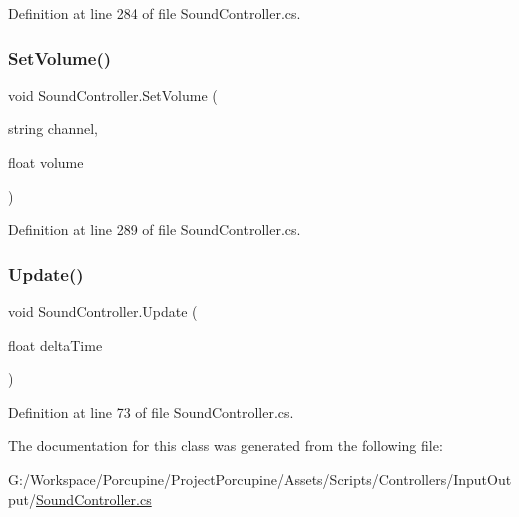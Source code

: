 Definition at line 284 of file Sound\+Controller.\+cs.

\mbox{\label{class_sound_controller_a07ee1ed4defecdd71d576c3349ccbc4c}} 
\subsubsection{\texorpdfstring{Set\+Volume()}{SetVolume()}\hspace{0.1cm}{\footnotesize\ttfamily [2/2]}}
{\footnotesize\ttfamily void Sound\+Controller.\+Set\+Volume (\begin{DoxyParamCaption}\item[{string}]{channel,  }\item[{float}]{volume }\end{DoxyParamCaption})}



Definition at line 289 of file Sound\+Controller.\+cs.

\mbox{\label{class_sound_controller_ae855044aa3506d706299f79ec8dd48f3}} 
\subsubsection{\texorpdfstring{Update()}{Update()}}
{\footnotesize\ttfamily void Sound\+Controller.\+Update (\begin{DoxyParamCaption}\item[{float}]{delta\+Time }\end{DoxyParamCaption})}



Definition at line 73 of file Sound\+Controller.\+cs.



The documentation for this class was generated from the following file\+:\begin{DoxyCompactItemize}
\item 
G\+:/\+Workspace/\+Porcupine/\+Project\+Porcupine/\+Assets/\+Scripts/\+Controllers/\+Input\+Output/\hyperlink{_sound_controller_8cs}{Sound\+Controller.\+cs}\end{DoxyCompactItemize}
